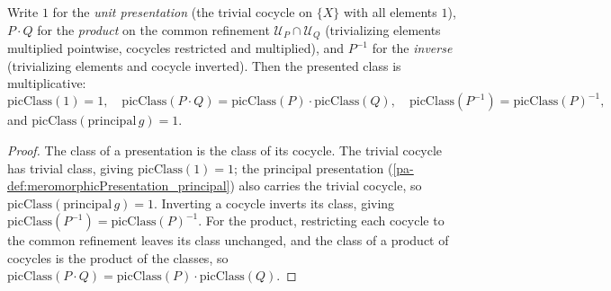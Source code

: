 \begin{theorem}
  \label{pa-thm:meromorphicPresentation_picClass_hom}
  \leanok

  Write \(1\) for the \emph{unit presentation} (the trivial cocycle on \(\{X\}\) with all elements
  \(1\)), \(P \cdot Q\) for the \emph{product} on the common refinement \(\mathcal U_P \cap
  \mathcal U_Q\) (trivializing elements multiplied pointwise, cocycles restricted and multiplied),
  and \(P^{-1}\) for the \emph{inverse} (trivializing elements and cocycle inverted). Then the
  presented class is multiplicative:
  \[
    \mathrm{picClass}(1) = 1, \quad \mathrm{picClass}(P \cdot Q) = \mathrm{picClass}(P) \cdot
      \mathrm{picClass}(Q), \quad \mathrm{picClass}(P^{-1}) = \mathrm{picClass}(P)^{-1},
  \]
  and \(\mathrm{picClass}(\mathrm{principal}\, g) = 1\).
\end{theorem}
\begin{proof}
  \leanok
  The class of a presentation is the class of its cocycle. The trivial cocycle has trivial class,
  giving \(\mathrm{picClass}(1) = 1\); the principal presentation
  (\ref{pa-def:meromorphicPresentation_principal}) also carries the trivial cocycle, so
  \(\mathrm{picClass}(\mathrm{principal}\, g) = 1\). Inverting a cocycle inverts its class,
  giving \(\mathrm{picClass}(P^{-1}) = \mathrm{picClass}(P)^{-1}\). For the product, restricting
  each cocycle to the common refinement leaves its class unchanged, and the class of a product of
  cocycles is the product of the classes, so \(\mathrm{picClass}(P \cdot Q) = \mathrm{picClass}(P)
  \cdot \mathrm{picClass}(Q)\).
\end{proof}

